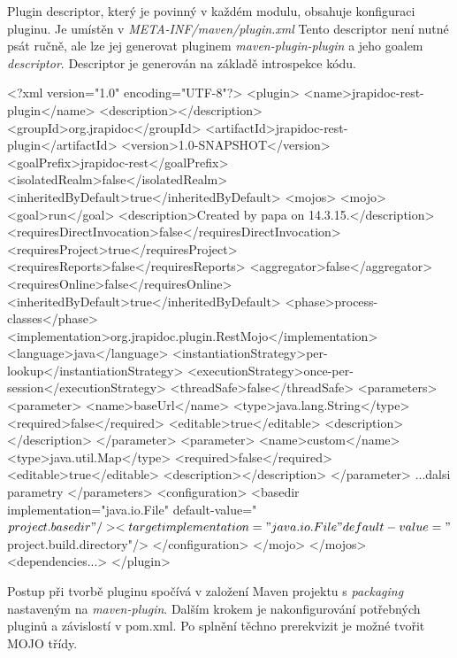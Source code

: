 \documentclass[11pt,twoside,a4paper]{book}
\begin{document}
Plugin descriptor, který je povinný v každém modulu, obsahuje konfiguraci pluginu. Je
umístěn v {\em META-INF/maven/plugin.xml} Tento descriptor není nutné psát
ručně, ale lze jej generovat pluginem {\em maven-plugin-plugin} a jeho goalem
{\em descriptor}. Descriptor je generován na základě introspekce kódu.

\begin{code}[frame=single,caption={Ukázka plugin descriptoru}]
<?xml version="1.0" encoding="UTF-8"?>
<plugin>
  <name>jrapidoc-rest-plugin</name>
  <description></description>
  <groupId>org.jrapidoc</groupId>
  <artifactId>jrapidoc-rest-plugin</artifactId>
  <version>1.0-SNAPSHOT</version>
  <goalPrefix>jrapidoc-rest</goalPrefix>
  <isolatedRealm>false</isolatedRealm>
  <inheritedByDefault>true</inheritedByDefault>
  <mojos>
    <mojo>
      <goal>run</goal>
      <description>Created by papa on 14.3.15.</description>
      <requiresDirectInvocation>false</requiresDirectInvocation>
      <requiresProject>true</requiresProject>
      <requiresReports>false</requiresReports>
      <aggregator>false</aggregator>
      <requiresOnline>false</requiresOnline>
      <inheritedByDefault>true</inheritedByDefault>
      <phase>process-classes</phase>
      <implementation>org.jrapidoc.plugin.RestMojo</implementation>
      <language>java</language>
      <instantiationStrategy>per-lookup</instantiationStrategy>
      <executionStrategy>once-per-session</executionStrategy>
      <threadSafe>false</threadSafe>
      <parameters>
        <parameter>
          <name>baseUrl</name>
          <type>java.lang.String</type>
          <required>false</required>
          <editable>true</editable>
          <description></description>
        </parameter>
        <parameter>
          <name>custom</name>
          <type>java.util.Map</type>
          <required>false</required>
          <editable>true</editable>
          <description></description>
        </parameter>
    ...dalsi parametry
      </parameters>
      <configuration>
        <basedir implementation="java.io.File" 
        default-value="${project.basedir}"/>
        <target implementation="java.io.File" 
        default-value="${project.build.directory}"/>
      </configuration>
    </mojo>
  </mojos>
  <dependencies...>
</plugin>
\end{code}

Postup při tvorbě pluginu spočívá v založení Maven projektu s {\em packaging}
nastaveným na {\em maven-plugin}. Dalším krokem je nakonfigurování potřebných
pluginů a závislostí v pom.xml.
Po splnění těchno prerekvizit je možné tvořit MOJO třídy.
\end{document}
